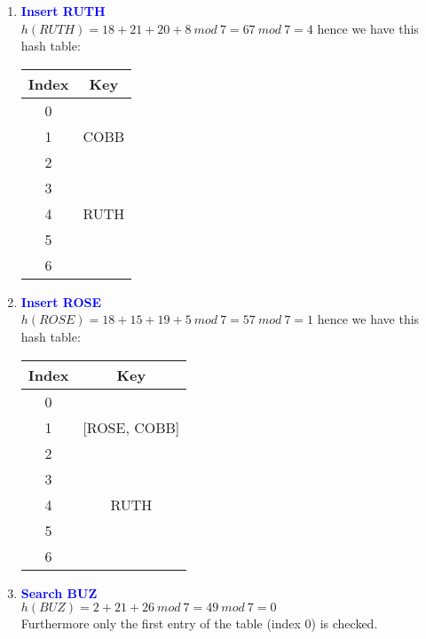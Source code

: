 \documentclass[11pt]{article}
\begin{document}
\begin{enumerate}
\begin{enumerate}
\begin{center}
        \end{center}
    \item \textbf{\textcolor{blue}{Insert RUTH}}
        \\ $h(RUTH)=18+21+20+8\ mod\ 7 = 67\ mod\ 7 = 4$ hence we have this hash table:
        \begin{center}
        \begin{tabular}{ | c | c | } 
            \hline
            Index & Key \\ 
            \hline\hline
            0 & \\
            \hline
            1 & COBB\\
            \hline
            2 & \\
            \hline
            3 & \\
            \hline
            4 & RUTH\\
            \hline
            5 & \\
            \hline
            6 & \\
            \hline
        \end{tabular}
        \end{center}
    \item \textbf{\textcolor{blue}{Insert ROSE}}
        \\ $h(ROSE)=18+15+19+5\ mod\ 7 = 57\ mod\ 7 = 1$ hence we have this hash table:
        \begin{center}
        \begin{tabular}{ | c | c | } 
            \hline
            Index & Key \\ 
            \hline\hline
            0 & \\
            \hline
            1 & [ROSE, COBB]\\
            \hline
            2 & \\
            \hline
            3 & \\
            \hline
            4 & RUTH\\
            \hline
            5 & \\
            \hline
            6 & \\
            \hline
        \end{tabular}
        \end{center}
    \item \textbf{\textcolor{blue}{Search BUZ}}
        \\ $h(BUZ)=2+21+26\ mod\ 7 = 49\ mod\ 7 = 0$ 
        \\ Furthermore only the first entry of the table (index $0$) is checked.

\end{enumerate}
\end{enumerate}
\end{document}
